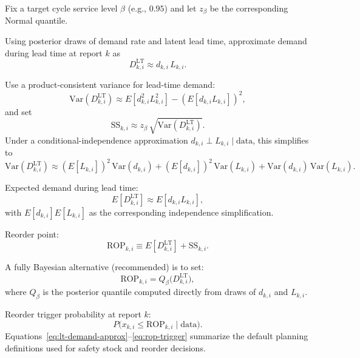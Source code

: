 \documentclass[11pt]{article}
\begin{document}
\begin{enumerate}
  Fix a target cycle service level $\beta$ (e.g., $0.95$) and let $z_{\beta}$ be the corresponding Normal quantile.

  Using posterior draws of demand rate and latent lead time, approximate demand during lead time at report $k$ as
  \begin{equation}\label{eq:lt-demand-approx}
    D^{\mathrm{LT}}_{k,i} \approx d_{k,i}\,L_{k,i}.
  \end{equation}

  Use a product-consistent variance for lead-time demand:
  \begin{equation}\label{eq:lt-demand-var}
    \mathrm{Var}(D^{\mathrm{LT}}_{k,i}) \approx E\!\left[d_{k,i}^2 L_{k,i}^2\right] - \left(E\!\left[d_{k,i}L_{k,i}\right]\right)^2,
  \end{equation}
  and set
  \begin{equation}\label{eq:ss-def}
    \text{SS}_{k,i} \approx z_{\beta}\,\sqrt{\mathrm{Var}(D^{\mathrm{LT}}_{k,i})}.
  \end{equation}
  Under a conditional-independence approximation $d_{k,i}\perp L_{k,i}\mid\text{data}$, this simplifies to
  \[
    \mathrm{Var}(D^{\mathrm{LT}}_{k,i}) \approx (E[L_{k,i}])^2\,\mathrm{Var}(d_{k,i}) + (E[d_{k,i}])^2\,\mathrm{Var}(L_{k,i}) + \mathrm{Var}(d_{k,i})\,\mathrm{Var}(L_{k,i}).
  \]

  Expected demand during lead time:
  \begin{equation}\label{eq:lt-demand-mean}
    E[D^{\mathrm{LT}}_{k,i}] \approx E\!\left[d_{k,i}L_{k,i}\right],
  \end{equation}
  with $E[d_{k,i}]E[L_{k,i}]$ as the corresponding independence simplification.

  Reorder point:
  \begin{equation}\label{eq:rop-def}
    \text{ROP}_{k,i} \equiv E[D^{\mathrm{LT}}_{k,i}] + \text{SS}_{k,i}.
  \end{equation}

  A fully Bayesian alternative (recommended) is to set:
  \begin{equation}\label{eq:rop-quantile}
    \text{ROP}_{k,i} = Q_{\beta}\bigl(D^{\mathrm{LT}}_{k,i}\bigr),
  \end{equation}
  where $Q_{\beta}$ is the posterior quantile computed directly from draws of $d_{k,i}$ and $L_{k,i}$.

  Reorder trigger probability at report $k$:
  \begin{equation}\label{eq:rop-trigger}
    P\bigl(x_{k,i} \le \text{ROP}_{k,i}\mid\text{data}\bigr).
  \end{equation}
  Equations~\eqref{eq:lt-demand-approx}--\eqref{eq:rop-trigger} summarize the default planning definitions used for safety stock and reorder decisions.


\end{enumerate}
\end{document}
